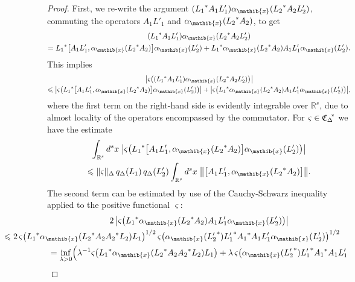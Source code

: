 \documentclass[11pt,twoside,openright]{report}
\theoremstyle{definition}
\theoremstyle{plain}
\theoremstyle{remark}
\theoremstyle{assumption}
\newcommand{\bcomm}[2]{\bigl[ #1 , #2 \bigr]}
\newcommand{\babs}[1]{\bigl\lvert #1 \bigr\rvert}
\newcommand{\norm}[1]{\lVert #1 \rVert}
\newcommand{\bnorm}[1]{\bigl\lVert #1 \bigr\rVert}
\newcommand{\qDx}[1]{q_\Delta ( #1 )}
\newcommand{\Rs}{\mathbb{R}^s}
\newcommand{\CDstar}{{\mathfrak{C}_\Delta}^{\negthickspace *}}
\newcommand{\aibx}{\alpha_\mathib{x}}
\begin{document}
\begin{proof}
  First, we re-write the argument $( {L_1}^* A_1 L'_1 ) \aibx (
  {L_2}^* A_2 L'_2 )$, commuting the operators $A_1 L'_1$ and $\aibx (
  {L_2}^* A_2 )$, to get
  \begin{multline}
    \label{eq-commuted-argument}
    ( {L_1}^* A_1 L'_1 ) \aibx ( {L_2}^* A_2 L'_2 ) \\
    = {L_1}^* \bcomm{A_1 L'_1}{\aibx ( {L_2}^* A_2 )} \aibx ( L'_2 ) +
    {L_1}^* \aibx ( {L_2}^* A_2 ) A_1 L'_1 \aibx ( L'_2 ) \text{.}
  \end{multline}
  This implies
  \begin{multline}
    \label{eq-varsigma-sum-estimate}
    \babs{\varsigma \bigl( ( {L_1}^* A_1 L'_1 ) \aibx ( {L_2}^* A_2
    L'_2 ) \bigr)} \\
    \leqslant \babs{\varsigma \bigl( {L_1}^* \bcomm{A_1 L'_1}{\aibx (
    {L_2}^* A_2 )} \aibx ( L'_2 ) \bigr)} + \babs{\varsigma \bigl(
    {L_1}^* \aibx ( {L_2}^* A_2 ) A_1 L'_1 \aibx ( L'_2 ) \bigr)}
    \text{,}
  \end{multline}
  where the first term on the right-hand side is evidently integrable
  over $\Rs$, due to almost locality of the operators encompassed by
  the commutator. For $\varsigma \in \CDstar$ we have the estimate
  \begin{multline}
    \label{eq-first-varsigmaintegral-estimate}
    \int_{\Rs} d^s x \; \babs{\varsigma \bigl( {L_1}^* \bcomm{A_1
    L'_1}{\aibx ( {L_2}^* A_2 )} \aibx ( L'_2 ) \bigr)} \\
    \leqslant \norm{\varsigma}_\Delta \, \qDx{L_1} \, \qDx{L'_2}
    \int_{\Rs} d^s x \; \bnorm{\bcomm{A_1 L'_1}{\aibx ( {L_2}^* A_2
    )}} \text{.}
  \end{multline}
  The second term can be estimated by use of the Cauchy-Schwarz
  inequality applied to the positive functional $\varsigma$:
  \begin{multline}
    \label{eq-varsigma-cauchy-schwarz}
    2 \, \babs{\varsigma \bigl( {L_1}^* \aibx ( {L_2}^* A_2 ) A_1 L'_1
    \aibx ( L'_2 ) \bigr)} \\
    \mspace{-115mu} \leqslant 2 \, \varsigma \bigl( {L_1}^* \aibx (
    {L_2}^* A_2 {A_2}^* L_2 ) L_1 \bigr)^{1/2} \, \varsigma \bigl(
    \aibx ( {L'_2}^* ) {L'_1}^* {A_1}^* A_1 L'_1 \aibx ( L'_2 )
    \bigr)^{1/2} \\
    = \inf_{\lambda > 0} \Bigl( \lambda^{-1} \varsigma \bigl( {L_1}^*
    \aibx ( {L_2}^* A_2 {A_2}^* L_2 ) L_1 \bigr) + \lambda \,
    \varsigma \bigl( \aibx ( {L'_2}^* ) {L'_1}^* {A_1}^* A_1 L'_1

\end{multline}
\end{proof}
\end{document}
